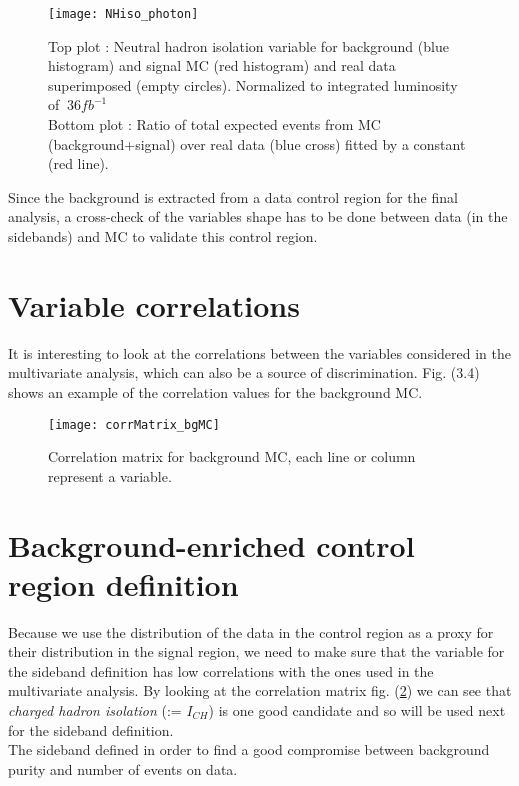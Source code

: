\begin{figure}[h!]
  \centering
  \texttt{[image: NHiso\_photon]}\\[1cm]
  \caption{Top plot : Neutral hadron isolation variable for background (blue histogram) and signal MC (red histogram) and real data superimposed (empty circles). Normalized to integrated luminosity of $~36fb^{-1}$\\Bottom plot : Ratio of total expected events from MC (background+signal) over real data (blue cross) fitted by a constant (red line).}
  \label{NHiso_photon_dataVsMCbg}
\end{figure}

Since the background is extracted from a data control region for the final analysis, a cross-check of the variables
shape has to be done between data (in the sidebands) and MC to validate this control region.\\

\section{Variable correlations}

It is interesting to look at the correlations between the variables considered in the multivariate analysis, which can also be a source of discrimination.
Fig. (3.4) shows an example of the correlation values for the background MC.

\begin{figure}[ht!]
  \centering
  \texttt{[image: corrMatrix\_bgMC]}\\[1cm]
  \caption{Correlation matrix for background MC, each line or column represent a variable.}
  \label{corrMatrix_bgMC}
\end{figure}

\section{Background-enriched control region definition}

Because we use the distribution of the data in the control region as a proxy for their distribution in the signal region, we need to make sure that the variable for the sideband definition has low correlations with the ones used in the multivariate analysis.
By looking at the correlation matrix fig. (\ref{corrMatrix_bgMC}) we can see that \emph{charged hadron isolation} (:= $I_{CH}$) is one good candidate and so will be used next for the sideband definition.\\
The sideband defined in order to find a good compromise between background purity and number of events on data.


